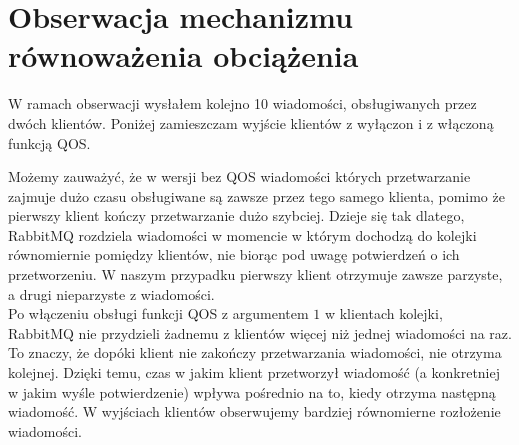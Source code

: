 \documentclass{article}
\begin{document}
    \section{Obserwacja mechanizmu równoważenia obciążenia}
        W ramach obserwacji wysłałem kolejno 10 wiadomości, obsługiwanych przez dwóch klientów. Poniżej zamieszczam wyjście klientów z wyłączon i z włączoną funkcją QOS.
        
        
        Możemy zauważyć, że w wersji bez QOS wiadomości których przetwarzanie zajmuje dużo czasu obsługiwane są zawsze przez tego samego klienta, pomimo że pierwszy klient kończy przetwarzanie dużo szybciej. Dzieje się tak dlatego, RabbitMQ rozdziela wiadomości w momencie w którym dochodzą do kolejki równomiernie pomiędzy klientów, nie biorąc pod uwagę potwierdzeń o ich przetworzeniu. W naszym przypadku pierwszy klient otrzymuje zawsze parzyste, a drugi nieparzyste z wiadomości. \\
        Po włączeniu obsługi funkcji QOS z argumentem $1$ w klientach kolejki, RabbitMQ nie przydzieli żadnemu z klientów więcej niż jednej wiadomości na raz. To znaczy, że dopóki klient nie zakończy przetwarzania wiadomości, nie otrzyma kolejnej. Dzięki temu, czas w jakim klient przetworzył wiadomość (a konkretniej w jakim wyśle potwierdzenie) wpływa pośrednio na to, kiedy otrzyma następną wiadomość. W wyjściach klientów obserwujemy bardziej równomierne rozłożenie wiadomości.
        
\end{document}
